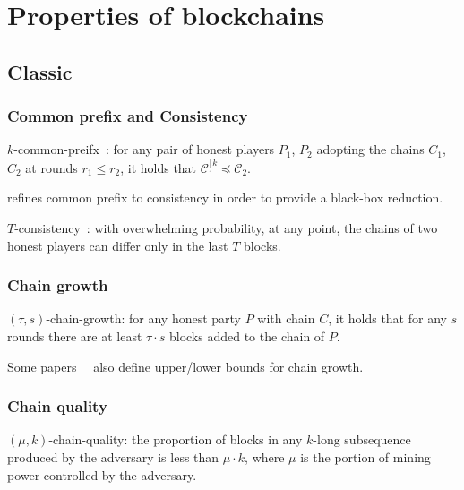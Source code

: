 \documentclass[runningheads]{llncs}
\begin{document}
\section{Properties of blockchains}

\subsection{Classic}

\subsubsection{Common prefix and Consistency}
$k$-common-preifx~\cite{garay2015bitcoin}:
for any pair of honest players $P_1$, $P_2$ adopting the chains $C_1$, $C_2$ at rounds $r_1 \leq r_2$, it holds that $\mathcal{C}_{1}^{\lceil k} \preceq \mathcal{C}_2$.

\cite{pass2017analysis} refines common prefix to consistency in order to provide a black-box reduction.

$T$-consistency~\cite{pass2017analysis}:
with overwhelming probability, at any point, the chains of two honest players can differ only in the last $T$ blocks.

\subsubsection{Chain growth}
$(\tau, s)$-chain-growth:
for any honest party $P$ with chain $C$, it holds that for any $s$ rounds there are at least $\tau \cdot s$ blocks added to the chain of $P$.

Some papers~\cite{rocket2018snowflake}~\cite{pass2017sleepy} also define upper/lower bounds for chain growth.

\subsubsection{Chain quality}
$(\mu, k)$-chain-quality: the proportion of blocks in any $k$-long subsequence produced by the adversary is less than $\mu \cdot k$, where $\mu$ is the portion of mining power controlled by the adversary.






\end{document}
